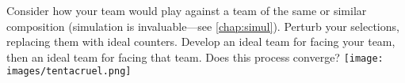 Consider how your team would play against a team of the same or similar composition (simulation
  is invaluable---see \autoref{chap:simul}).
Perturb your selections, replacing them with ideal counters.
Develop an ideal team for facing your team, then an ideal team for facing that team.
Does this process converge?
\vfill\texttt{[image: images/tentacruel.png]}
